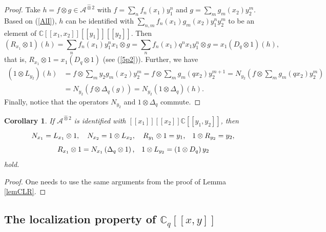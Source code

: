 \documentclass[12pt,reqno]{amsart}%
\theoremstyle{plain}
\newtheorem{corollary}{Corollary}
\numberwithin{theorem}{section} \numberwithin{equation}{section}
\numberwithin{lemma}{section}
\numberwithin{remark}{section}
\numberwithin{example}{section}
\numberwithin{proposition}{section}
\numberwithin{definition}{section}
\numberwithin{corollary}{section}
\begin{document}
\begin{proof}
Take $h=f\otimes g\in\mathcal{A}^{\widehat{\otimes}2}$ with $f=\sum_{n}%
f_{n}\left(  x_{1}\right)  y_{1}^{n}$ and $g=\sum_{m}g_{m}\left(
x_{2}\right)  y_{2}^{m}$. Based on (\ref{AlI}), $h$ can be identified with
$\sum_{n,m}f_{n}\left(  x_{1}\right)  g_{m}\left(  x_{2}\right)  y_{1}%
^{n}y_{2}^{m}$ to be an element of $\mathbb{C}\left[  \left[  x_{1}%
,x_{2}\right]  \right]  \left[  \left[  y_{1}\right]  \right]  \left[  \left[
y_{2}\right]  \right]  $. Then
\[
\left(  R_{x_{1}}\otimes1\right)  \left(  h\right)  =\sum_{n}f_{n}\left(
x_{1}\right)  y_{1}^{n}x_{1}\otimes g=\sum_{n}f_{n}\left(  x_{1}\right)
q^{n}x_{1}y_{1}^{n}\otimes g=x_{1}\left(  D_{q}\otimes1\right)  \left(
h\right)  ,
\]
that is, $R_{x_{1}}\otimes1=x_{1}\left(  D_{q}\otimes1\right)  $ (see
(\ref{5p2})). Further, we have
\begin{align*}
\left(  1\otimes L_{y_{2}}\right)  \left(  h\right)   &  =f\otimes\sum
_{m}y_{2}g_{m}\left(  x_{2}\right)  y_{2}^{m}=f\otimes\sum_{m}g_{m}\left(
qx_{2}\right)  y_{2}^{m+1}=N_{y_{2}}\left(  f\otimes\sum_{m}g_{m}\left(
qx_{2}\right)  y_{2}^{m}\right) \\
&  =N_{y_{2}}\left(  f\otimes\Delta_{q}\left(  g\right)  \right)  =N_{y_{2}%
}\left(  1\otimes\Delta_{q}\right)  \left(  h\right)  .
\end{align*}
Finally, notice that the operators $N_{y_{2}}$ and $1\otimes\Delta_{q}$ commute.
\end{proof}

\begin{corollary}
\label{corCLR1}If $\mathcal{A}^{\widehat{\otimes}2}$ is identified with
$\left[  \left[  x_{1}\right]  \right]  \left[  \left[  x_{2}\right]  \right]
\mathbb{C}\left[  \left[  y_{1},y_{2}\right]  \right]  $, then
\[
N_{x_{1}}=L_{x_{1}}\otimes1,\quad N_{x_{2}}=1\otimes L_{x_{2}},\quad R_{y_{1}%
}\otimes1=y_{1}\text{,\quad}1\otimes R_{y_{2}}=y_{2},
\]%
\[
R_{x_{1}}\otimes1=N_{x_{1}}\left(  \Delta_{q}\otimes1\right)  \text{,\quad
}1\otimes L_{y_{2}}=\left(  1\otimes D_{q}\right)  y_{2}%
\]
hold.
\end{corollary}

\begin{proof}
One needs to use the same arguments from the proof of Lemma \ref{lemCLR}.
\end{proof}

\subsection{The localization property of $\mathbb{C}_{q}\left[  \left[
x,y\right]  \right]  $\label{subsecCQxy}}
\end{document}
